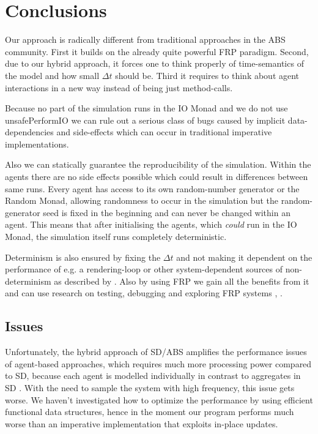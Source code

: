 \section{Conclusions}
\label{sec:conclusions}

Our approach is radically different from traditional approaches in the ABS community. First it builds on the already quite powerful FRP paradigm. Second, due to our hybrid approach, it forces one to think properly of time-semantics of the model and how small $\Delta t$ should be. Third it requires to think about agent interactions in a new way instead of being just method-calls.

Because no part of the simulation runs in the IO Monad and we do not use unsafePerformIO we can rule out a serious class of bugs caused by implicit data-dependencies and side-effects which can occur in traditional imperative implementations.

Also we can statically guarantee the reproducibility of the simulation. Within the agents there are no side effects possible which could result in differences between same runs. Every agent has access to its own random-number generator or the Random Monad, allowing randomness to occur in the simulation but the random-generator seed is fixed in the beginning and can never be changed within an agent. This means that after initialising the agents, which \textit{could} run in the IO Monad, the simulation itself runs completely deterministic.

Determinism is also ensured by fixing the $\Delta t$ and not making it dependent on the performance of e.g. a rendering-loop or other system-dependent sources of non-determinism as described by \cite{perez_testing_2017}. Also by using FRP we gain all the benefits from it and can use research on testing, debugging and exploring FRP systems \cite{perez_testing_2017}, \cite{perez_back_2017}.

\subsection*{Issues}
Unfortunately, the hybrid approach of SD/ABS amplifies the performance issues of agent-based approaches, which requires much more processing power compared to SD, because each agent is modelled individually in contrast to aggregates in SD \cite{macal_agent-based_2010}. With the need to sample the system with high frequency, this issue gets worse. We haven't investigated how to optimize the performance by using efficient functional data structures, hence in the moment our program performs much worse than an imperative implementation that exploits in-place updates.

